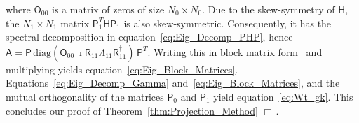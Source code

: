 \documentclass[english,12pt,jmp,graphicx]{revtex4-1}
\newcommand{\thmref}[1]{Theorem~\ref{#1}}
\newcommand{\Hm}{\mathsf{H}}
\newcommand{\Am}{\mathsf{A}}
\newcommand{\Pm}{\mathsf{P}}
\newcommand{\Rm}{\mathsf{R}}
\newcommand{\Ib}{\mathsf{I}}
\newcommand{\Om}{\mathsf{O}}
\begin{document}
where $\Om_{00}$ is a matrix of zeros of size $N_0\times N_0$. Due
to the skew-symmetry of $\Hm$, the $N_1\times N_1$ matrix
$\Pm_1^T\Hm\Pm_1$ is also skew-symmetric. Consequently, it has the
spectral decomposition in equation~\eqref{eq:Eig_Decomp_PHP}, hence
$\Am=\Pm\,\text{diag}(\Om_{00}\
\imath\Rm_{11}\Lambda_{11}\Rm_{11}^\dagger)\,\Pm^T$. Writing this in
block matrix form~\cite{Murphy:2015:CMS:13:4:825} and multiplying
yields
equation~\eqref{eq:Eig_Block_Matrices}. Equations~\eqref{eq:Eig_Decomp_Gamma}
and~\eqref{eq:Eig_Block_Matrices}, and the mutual orthogonality of the
matrices $\Pm_0$ and $\Pm_1$ yield equation~\eqref{eq:Wt_gk}. This
concludes our proof of \thmref{thm:Projection_Method} $\Box\,.$
\end{document}
